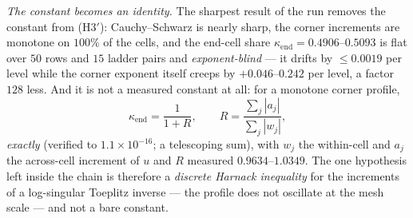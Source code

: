 \documentclass[11pt,a4paper]{article}
\begin{document}
\emph{The constant becomes an identity.} The sharpest result of the run removes the constant
from (H3$'$): Cauchy--Schwarz is nearly sharp, the corner increments are monotone on $100\%$
of the cells, and the end-cell share $\kappa_{\mathrm{end}}=0.4906$--$0.5093$ is flat over
$50$ rows and $15$ ladder pairs and \emph{exponent-blind} --- it drifts by $\le0.0019$ per
level while the corner exponent itself creeps by $+0.046$--$0.242$ per level, a factor $128$
less. And it is not a measured constant at all: for a monotone corner profile,
\[
\kappa_{\mathrm{end}}=\frac{1}{1+R},\qquad
R=\frac{\sum_j|a_j|}{\sum_j|w_j|},
\]
\emph{exactly} (verified to $1.1\times10^{-16}$; a telescoping sum), with $w_j$ the
within-cell and $a_j$ the across-cell increment of $u$ and $R$ measured $0.9634$--$1.0349$.
The one hypothesis left inside the chain is therefore a \emph{discrete Harnack inequality} for
the increments of a log-singular Toeplitz inverse --- the profile does not oscillate at the
mesh scale --- and not a bare constant.
\end{document}
